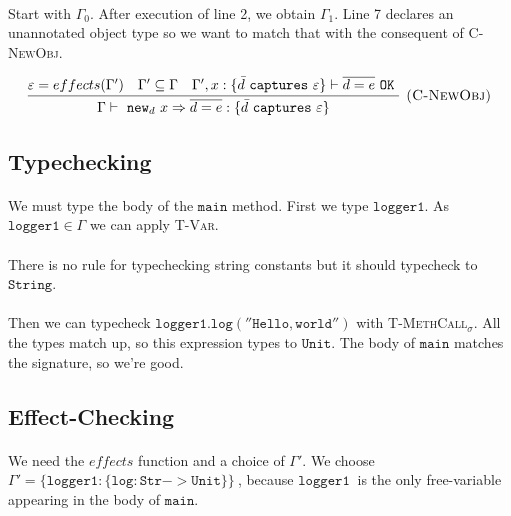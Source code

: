 \documentclass{llncs}
\newcommand{\keywadj}[1]{\mathtt{#1}}
\newcommand{\keyw}[1]{\keywadj{#1}~}
\begin{document}
\paragraph{}
Start with $\Gamma_0$. After execution of line 2, we obtain $\Gamma_1$. Line 7 declares an unannotated object type so we want to match that with the consequent of \textsc{C-NewObj}.

\[
\begin{array}{c}
\infer[\textsc{(C-NewObj)}]
	{\Gamma \vdash~\keywadj{new}_d~x \Rightarrow \overline{d = e} : \{  \bar d~\keyw{captures} \varepsilon \} }
	{\varepsilon = effects(\Gamma') & \Gamma' \subseteq \Gamma & \Gamma', x : \{ \bar d~\keyw {captures} \varepsilon \} \vdash \overline{d = e}~\keyw{OK}} \\
\end{array}
\]

\subsection*{Typechecking}

\paragraph{}
We must type the body of the $\keywadj{main}$ method. First we type $\keywadj{logger1}$. As $\keywadj{logger1 \in \Gamma}$ we can apply  \textsc{T-Var}.

\paragraph{}
There is no rule for typechecking string constants but it should typecheck to $\keywadj{String}$.

\paragraph{}
Then we can typecheck $\keywadj{logger1.log(''Hello, world'')}$ with \textsc{T-MethCall$_\sigma$}. All the types match up, so this expression types to $\keywadj{Unit}$. The body of $\keywadj{main}$ matches the signature, so we're good.


\subsection*{Effect-Checking}

\paragraph{}
We need the $effects$ function and a choice of $\Gamma'$. We choose $\keyw{\Gamma' = \{ logger1 : \{ log : Str -> Unit \}\}}$, because $\keyw{logger1}$ is the only free-variable appearing in the body of $\keywadj{main}$.
\end{document}
